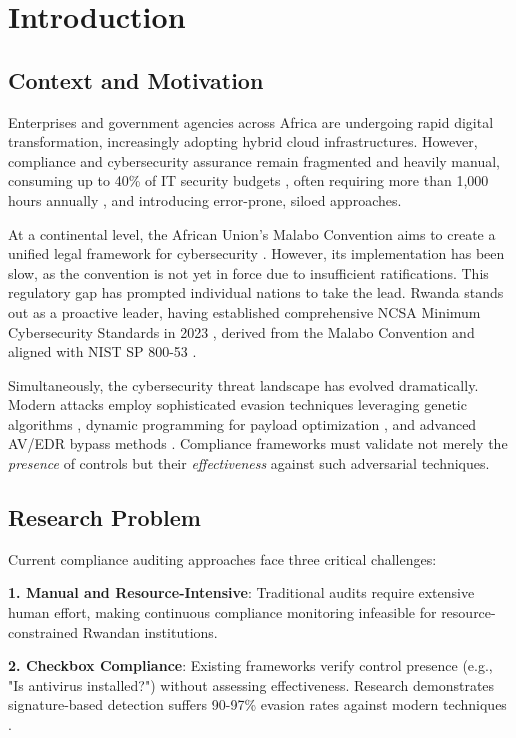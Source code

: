 \documentclass[11pt,conference]{IEEEtran}
\begin{document}
\section{Introduction}

\subsection{Context and Motivation}

Enterprises and government agencies across Africa are undergoing rapid digital transformation, increasingly adopting hybrid cloud infrastructures. However, compliance and cybersecurity assurance remain fragmented and heavily manual, consuming up to 40\% of IT security budgets \cite{drata2025}, often requiring more than 1,000 hours annually \cite{ponemon2023}, and introducing error-prone, siloed approaches.

At a continental level, the African Union's Malabo Convention aims to create a unified legal framework for cybersecurity \cite{malabo2014}. However, its implementation has been slow, as the convention is not yet in force due to insufficient ratifications. This regulatory gap has prompted individual nations to take the lead. Rwanda stands out as a proactive leader, having established comprehensive NCSA Minimum Cybersecurity Standards in 2023 \cite{ncsa2023}, derived from the Malabo Convention and aligned with NIST SP 800-53 \cite{nist2020}.

Simultaneously, the cybersecurity threat landscape has evolved dramatically. Modern attacks employ sophisticated evasion techniques leveraging genetic algorithms \cite{ga_xss_paper}, dynamic programming for payload optimization \cite{dp_payload_paper}, and advanced AV/EDR bypass methods \cite{reverse_shell_paper, vaadata2024}. Compliance frameworks must validate not merely the \textit{presence} of controls but their \textit{effectiveness} against such adversarial techniques.

\subsection{Research Problem}

Current compliance auditing approaches face three critical challenges:

\textbf{1. Manual and Resource-Intensive}: Traditional audits require extensive human effort, making continuous compliance monitoring infeasible for resource-constrained Rwandan institutions.

\textbf{2. Checkbox Compliance}: Existing frameworks verify control presence (e.g., "Is antivirus installed?") without assessing effectiveness. Research demonstrates signature-based detection suffers 90-97\% evasion rates against modern techniques \cite{reverse_shell_paper, dp_payload_paper}.
\end{document}
